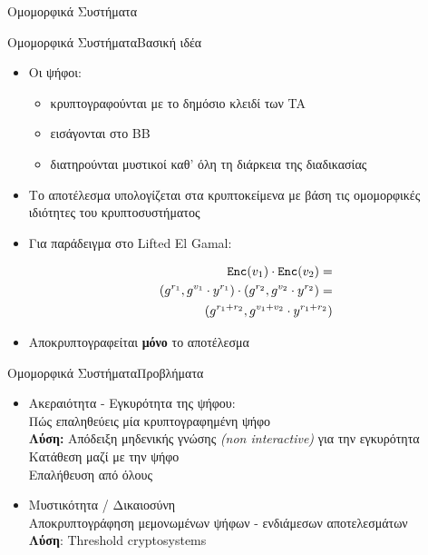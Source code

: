 \documentclass[handout]{beamer}
\begin{document}
\begin{section}{Ομομορφικά Συστήματα}

\begin{frame}{Ομομορφικά Συστήματα}{Βασική ιδέα}
    \begin{itemize}
        \item Οι ψήφοι: \pause 
        \begin{itemize}
            \item κρυπτογραφούνται με το δημόσιο κλειδί των TA
            \item εισάγονται στο BB
            \item διατηρούνται μυστικοί καθ' όλη τη διάρκεια της διαδικασίας
        \end{itemize}  \pause 
        \item Το αποτέλεσμα υπολογίζεται στα κρυπτοκείμενα με βάση τις ομομορφικές ιδιότητες του κρυπτοσυστήματος
        \item Για παράδειγμα στο Lifted El Gamal:
            \begin{center}
            \begin{align*}
                \mathtt{Enc}(v_1) \cdot \mathtt{Enc}(v_2) = \\ (g^{r_1},g^{v_1} \cdot y^{r_1}) \cdot (g^{r_2},g^{v_2} \cdot y^{r_2}) =\\ (g^{r_1+r_2},g^{v_1+v_2} \cdot y^{r_1+r_2}) 
            \end{align*}
            \end{center} \pause 
        \item Αποκρυπτογραφείται \textbf{μόνο} το αποτέλεσμα
        \end{itemize}
\end{frame} 
\begin{frame}{Ομομορφικά Συστήματα}{Προβλήματα}
       
        \begin{itemize}
            \item Ακεραιότητα - Εγκυρότητα της ψήφου: \\
            Πώς επαληθεύεις μία κρυπτογραφημένη ψήφο  \pause \\
            \textbf{Λύση:} Απόδειξη μηδενικής γνώσης \textit{(non interactive)} για την εγκυρότητα \\
            Κατάθεση μαζί με την ψήφο \\
            Επαλήθευση από όλους
            \item Μυστικότητα / Δικαιοσύνη \\ \pause 
            Αποκρυπτογράφηση μεμονωμένων ψήφων - ενδιάμεσων αποτελεσμάτων \\
            \textbf{Λύση}: Threshold cryptosystems
        \end{itemize}
  

\end{frame}
\end{section}
\end{document}
